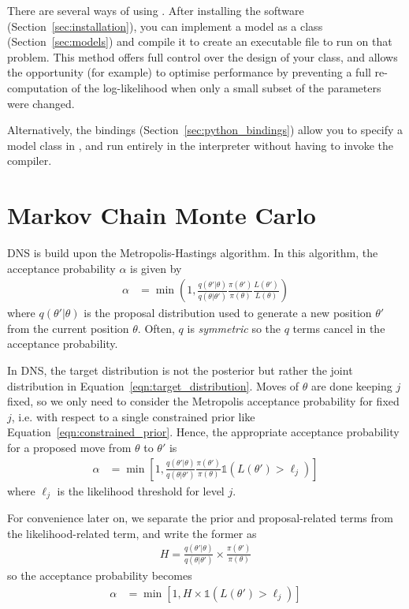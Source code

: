 \documentclass[article]{jss}
\newcommand{\params}{\theta}
\begin{document}
There are several ways of using . After installing the software
(Section~\ref{sec:installation}), you can implement a model as
a  class
(Section~\ref{sec:models}) and compile it to create an executable file
to run  on that problem. This method offers full control over the
design of your class, and allows the opportunity (for example) to optimise
performance by preventing a full re-computation of the log-likelihood when
only a small subset of the parameters were changed.

Alternatively, the 
bindings (Section~\ref{sec:python_bindings}) allow you
to specify a model class in , and run  entirely
in the  interpreter without having to invoke the 
compiler.

\section{Markov Chain Monte Carlo}\label{sec:mcmc}
DNS is build upon the Metropolis-Hastings algorithm.
In this algorithm, the acceptance probability $\alpha$
is given by
\begin{align}
\alpha &= \min\left(1,
\frac{q(\params'|\params)}{q(\params | \params')}
\frac{\pi(\params')}{\pi(\params)}\frac{L(\params')}{L(\params)}
\right)
\end{align}
where $q(\theta' | \theta)$ is the proposal distribution used to generate
a new position $\theta'$ from the current position $\theta$. Often,
$q$ is {\em symmetric} so the $q$ terms cancel in the acceptance probability.

In DNS, the target distribution is not the posterior but rather
the joint distribution in Equation~\ref{eqn:target_distribution}.
Moves of $\theta$ are done keeping $j$ fixed, so we only need
to consider the Metropolis acceptance probability for fixed $j$,
i.e. with respect to a single constrained prior like
Equation~\ref{eqn:constrained_prior}.
Hence, the appropriate acceptance probability
for a proposed move from $\theta$ to $\theta'$ is
\begin{align}
\alpha &= \min\left[1,
\frac{q(\params'|\params)}{q(\params | \params')}
\frac{\pi(\params')}{\pi(\params)}
\mathds{1}\left(L(\params') > \ell_j\right)
\right]
\label{eqn:log_hastings}
\end{align}
where $\ell_j$ is the likelihood threshold for level $j$.

For convenience later on, we 
separate the prior and proposal-related terms from
the likelihood-related term, and write the former as
\begin{align}
H = \frac{q(\params'|\params)}{q(\params | \params')}
\times \frac{\pi(\params')}{\pi(\params)}
\end{align}
so the acceptance probability becomes
\begin{align}
\alpha &= \min\left[1,
H\times
\mathds{1}\left(L(\params') > \ell_j\right)
\right]
\end{align}
\end{document}

